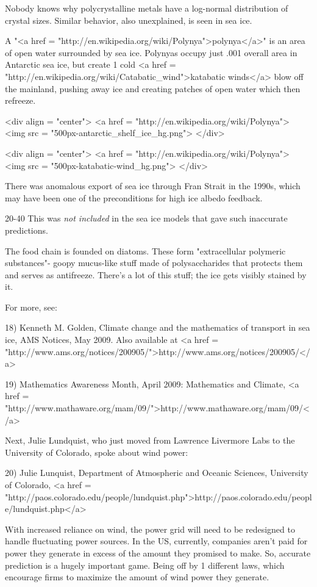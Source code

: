 Nobody knows why polycrystalline metals have a log-normal distribution
of crystal sizes.  Similar behavior, also unexplained, is seen in sea
ice.

A "<a href =
"http://en.wikipedia.org/wiki/Polynya">polynya</a>" is an area of
open water surrounded by sea ice.  Polynyas occupy just .001%
overall area in Antarctic sea ice, but create 1%
cold <a href = "http://en.wikipedia.org/wiki/Catabatic_wind">katabatic
winds</a> blow off the mainland, pushing away ice and creating patches
of open water which then refreeze.

<div align = "center">
<a href = "http://en.wikipedia.org/wiki/Polynya">
<img src = "500px-antarctic_shelf_ice_hg.png">
</div>

<div align = "center">
<a href = "http://en.wikipedia.org/wiki/Polynya">
<img src = "500px-katabatic-wind_hg.png">
</div>

There was anomalous export of sea ice through Fran Strait in the 1990s,
which may have been one of the preconditions for high ice albedo feedback.

20-40%
This was \emph{not included} in the sea ice models that gave such
inaccurate predictions.

The food chain is founded on diatoms.  These form "extracellular
polymeric substances"- goopy mucus-like stuff made of polysaccharides
that protects them and serves as antifreeze.  There's a lot of this
stuff; the ice gets visibly stained by it.

For more, see:

18) Kenneth M. Golden, Climate change and the mathematics of transport
in sea ice, AMS Notices, May 2009.  Also available at
<a href = "http://www.ams.org/notices/200905/">http://www.ams.org/notices/200905/</a>

19) Mathematics Awareness Month, April 2009: Mathematics and Climate,
<a href = "http://www.mathaware.org/mam/09/">http://www.mathaware.org/mam/09/</a>

Next, Julie Lundquist, who just moved from Lawrence Livermore Labs
to the University of Colorado, spoke about wind power:

20) Julie Lunquist, Department of Atmospheric and Oceanic Sciences,
University of Colorado, <a href = "http://paos.colorado.edu/people/lundquist.php">http://paos.colorado.edu/people/lundquist.php</a>

With increased reliance on wind, the power grid will need to be
redesigned to handle fluctuating power sources.  In the US, currently,
companies aren't paid for power they generate in excess of the amount
they promised to make.  So, accurate prediction is a hugely important
game.  Being off by 1%
different laws, which encourage firms to maximize the amount of wind
power they generate.

